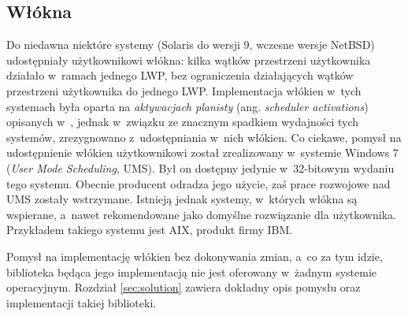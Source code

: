 \documentclass[12pt]{mwart}
\begin{document}
\subsection{Włókna}
\label{sec:fibers}
%
\indent
  Do niedawna niektóre systemy (Solaris do wersji 9, wczesne wersje NetBSD) udostępniały użytkownikowi włókna: kilka wątków przestrzeni użytkownika
  działało w~ramach jednego LWP, bez ograniczenia działających wątków przestrzeni użytkownika do jednego LWP.
  Implementacja włókien w~tych systemach była oparta na \emph{aktywacjach planisty} (ang. \emph{scheduler activations}) opisanych
  w~\cite{hennessy}, jednak
  w~związku ze znacznym spadkiem wydajności tych systemów, zrezygnowano z~udostępniania w~nich włókien.
  Co ciekawe, pomysł na udostępnienie włókien użytkownikowi został zrealizowany w~systemie Windows 7 (\emph{User Mode Scheduling}, UMS). Był on dostępny
  jedynie w~32-bitowym wydaniu tego systemu. Obecnie producent odradza jego użycie, zaś prace rozwojowe nad UMS zostały wstrzymane.
  Istnieją jednak systemy, w~których włókna są wspierane, a~nawet rekomendowane jako domyślne rozwiązanie dla użytkownika. Przykładem takiego systemu jest
  AIX, produkt firmy IBM.
\par
%
\indent
  Pomysł na implementację włókien bez dokonywania zmian, a~co za tym idzie, biblioteka będąca jego implementacją nie jest oferowany w~żadnym systemie operacyjnym.
  Rozdział \ref{sec:solution} zawiera dokładny opis pomysłu oraz implementacji takiej biblioteki.
\par
%
\end{document}
